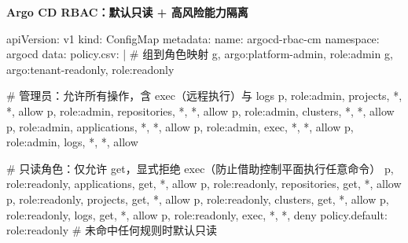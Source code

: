   \textbf{Argo CD RBAC：默认只读 + 高风险能力隔离}
\begin{AppendixCode}
apiVersion: v1
kind: ConfigMap
metadata:
  name: argocd-rbac-cm
  namespace: argocd
data:
  policy.csv: |
    # 组到角色映射
    g, argo:platform-admin, role:admin
    g, argo:tenant-readonly, role:readonly

    # 管理员：允许所有操作，含 exec（远程执行）与 logs
    p, role:admin, projects, *, *, allow
    p, role:admin, repositories, *, *, allow
    p, role:admin, clusters, *, *, allow
    p, role:admin, applications, *, *, allow
    p, role:admin, exec, *, *, allow
    p, role:admin, logs, *, *, allow

    # 只读角色：仅允许 get，显式拒绝 exec（防止借助控制平面执行任意命令）
    p, role:readonly, applications, get, *, allow
    p, role:readonly, repositories, get, *, allow
    p, role:readonly, projects, get, *, allow
    p, role:readonly, clusters, get, *, allow
    p, role:readonly, logs, get, *, allow
    p, role:readonly, exec, *, *, deny
  policy.default: role:readonly  # 未命中任何规则时默认只读
\end{AppendixCode}

